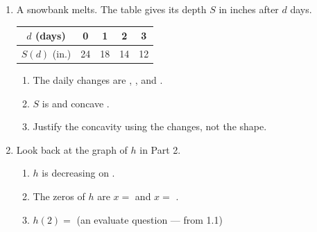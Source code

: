 \documentclass[10pt]{article}
\begin{document}
\vspace{0.1in}

\boxguard[24]
\begin{practicebox}
\begin{enumerate}[itemsep=8pt]
  \item A snowbank melts. The table gives its depth $S$ in inches after $d$
        days.

        \smallskip
        \renewcommand{\arraystretch}{1.4}
        \begin{tabular}{|c|c|c|c|c|}
        \hline
        $d$ (days) & 0 & 1 & 2 & 3 \\
        \hline
        $S(d)$ (in.) & 24 & 18 & 14 & 12 \\
        \hline
        \end{tabular}
        \smallskip

        \begin{enumerate}[label=(\alph*), itemsep=4pt]
          \item The daily changes are , , and
                .
          \item $S$ is  and concave .
          \item Justify the concavity using the changes, not the shape.

                \vspace{0.05in}
        \end{enumerate}

  \item Look back at the graph of $h$ in Part 2.

        \begin{enumerate}[label=(\alph*), itemsep=4pt]
          \item $h$ is decreasing on .
          \item The zeros of $h$ are $x = $  and $x = $ .
          \item $h(2) = $  \quad (an evaluate question --- from 1.1)
        \end{enumerate}
\end{enumerate}
\end{practicebox}
\end{document}
